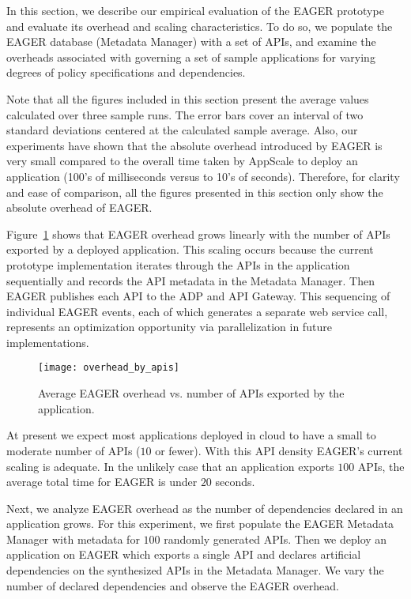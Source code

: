 In this section, we describe our empirical evaluation of the EAGER
prototype and evaluate its overhead and scaling characteristics.
To do so, we populate the EAGER database (Metadata Manager) with a 
set of APIs, and examine
the overheads associated with governing a set of sample applications 
for varying degrees of policy specifications and dependencies.

Note that all the figures included in this section present the average values calculated
over three sample runs. The error bars cover an interval of two standard deviations centered
at the calculated sample average. Also, our experiments have shown that the absolute
overhead introduced by EAGER is very small compared to the overall time taken by
AppScale to deploy an application (100's of milliseconds versus
to 10's of seconds). Therefore, for clarity and ease of comparison, all the figures presented 
in this section only show the absolute overhead of EAGER.

Figure~\ref{fig:overhead_by_apis} shows that EAGER overhead grows linearly
with the number of APIs exported by a deployed application.  This scaling occurs
because the current prototype implementation iterates through the APIs in the
application sequentially and records the API metadata in the Metadata Manager.
Then EAGER publishes each API to the ADP and API Gateway. This sequencing of
individual EAGER events, each of which generates a separate web service call,
represents an optimization opportunity via parallelization in future implementations.

\begin{figure}
\centering
\texttt{[image: overhead\_by\_apis]}
\caption{Average EAGER overhead vs. number of APIs exported by the
application.}
\label{fig:overhead_by_apis}
\end{figure}

At present we expect most applications deployed in cloud to have a small to 
moderate number of APIs ($10$ or fewer).  With this API density EAGER's current 
scaling is adequate.  In the
unlikely case that an application exports $100$ APIs,
the average total time for EAGER is under $20$ seconds.

Next, we analyze EAGER overhead as the number of dependencies declared in
an application grows. For this experiment, we first populate the EAGER
Metadata Manager with metadata for $100$ randomly 
generated APIs.
Then we
deploy an application on EAGER which exports a single API and declares
artificial dependencies on the synthesized
APIs in the Metadata Manager. We
vary the number of declared dependencies and observe the EAGER overhead.

